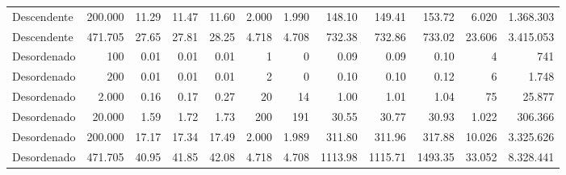 \documentclass[12pt,a4paper]{article}
\begin{document}
\begin{table}[H]
{\begin{tabular}{lr rrr rr rrr rr}
Descendente & 200.000 & 11.29 & 11.47 & 11.60 & 2.000 & 1.990 & 148.10 & 149.41 & 153.72 & 6.020 & 1.368.303 \\
Descendente & 471.705 & 27.65 & 27.81 & 28.25 & 4.718 & 4.708 & 732.38 & 732.86 & 733.02 & 23.606 & 3.415.053 \\
\midrule
Desordenado & 100 & 0.01 & 0.01 & 0.01 & 1 & 0 & 0.09 & 0.09 & 0.10 & 4 & 741 \\
Desordenado & 200 & 0.01 & 0.01 & 0.01 & 2 & 0 & 0.10 & 0.10 & 0.12 & 6 & 1.748 \\
Desordenado & 2.000 & 0.16 & 0.17 & 0.27 & 20 & 14 & 1.00 & 1.01 & 1.04 & 75 & 25.877 \\
Desordenado & 20.000 & 1.59 & 1.72 & 1.73 & 200 & 191 & 30.55 & 30.77 & 30.93 & 1.022 & 306.366 \\
Desordenado & 200.000 & 17.17 & 17.34 & 17.49 & 2.000 & 1.989 & 311.80 & 311.96 & 317.88 & 10.026 & 3.325.626 \\
Desordenado & 471.705 & 40.95 & 41.85 & 42.08 & 4.718 & 4.708 & 1113.98 & 1115.71 & 1493.35 & 33.052 & 8.328.441 \\
\bottomrule
\end{tabular}%
}
\end{table}
\end{document}
